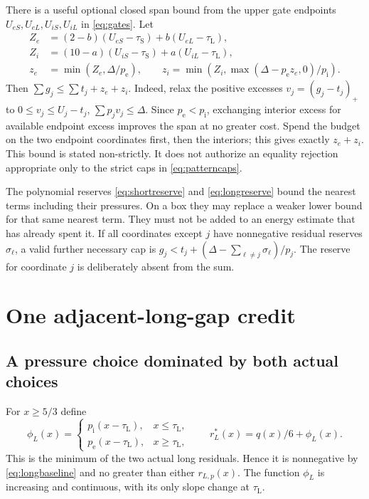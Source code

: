 \documentclass[11pt]{amsart}
\numberwithin{equation}{section}
\newcommand{\pe}{p_{\mathrm e}}
\newcommand{\pint}{p_{\mathrm i}}
\newcommand{\tS}{\tau_{\mathrm S}}
\newcommand{\tL}{\tau_{\mathrm L}}
\begin{document}
There is a useful optional closed span bound from the upper gate
endpoints $U_{eS},U_{eL},U_{iS},U_{iL}$ in \eqref{eq:gates}.
Let
\begin{align*}
 Z_e&=(2-b)(U_{eS}-\tS)+b(U_{eL}-\tL),\\
 Z_i&=(10-a)(U_{iS}-\tS)+a(U_{iL}-\tL),\\
 z_e&=\min(Z_e,\Delta/\pe),\qquad
 z_i=\min(Z_i,\max(\Delta-\pe z_e,0)/\pint).
\end{align*}
Then $\sum g_j\leq\sum t_j+z_e+z_i$. Indeed, relax the
positive excesses $v_j=(g_j-t_j)_+$ to
$0\leq v_j\leq U_j-t_j$, $\sum p_jv_j\leq\Delta$.
Since $\pe<\pint$, exchanging interior excess for available
endpoint excess improves the span at no greater cost. Spend the
budget on the two endpoint coordinates first, then the interiors;
this gives exactly $z_e+z_i$. This bound is stated non-strictly.
It does not authorize an equality rejection appropriate only to the
strict caps in \eqref{eq:patterncaps}.

The polynomial reserves \eqref{eq:shortreserve} and
\eqref{eq:longreserve} bound the nearest terms including their
pressures. On a box they may replace a weaker lower bound for that
same nearest term. They must not be added to an energy estimate that
has already spent it. If all coordinates except $j$ have nonnegative
residual reserves $\sigma_\ell$, a valid further necessary cap is
$g_j<t_j+(\Delta-\sum_{\ell\ne j}\sigma_\ell)/p_j$.
The reserve for coordinate $j$ is deliberately absent from the sum.

\section{One adjacent-long-gap credit}

\subsection{A pressure choice dominated by both actual choices}

For $x\geq5/3$ define
\begin{equation}\label{eq:worstlong}
 \phi_L(x)=
 \begin{cases}
 \pint(x-\tL),&x\leq\tL,\\
 \pe(x-\tL),&x\geq\tL,
 \end{cases}
 \qquad r_L^*(x)=q(x)/6+\phi_L(x).
\end{equation}
This is the minimum of the two actual long residuals. Hence it is
nonnegative by \eqref{eq:longbaseline} and no greater than either
$r_{L,p}(x)$. The function $\phi_L$ is increasing and continuous,
with its only slope change at $\tL$.
\end{document}
